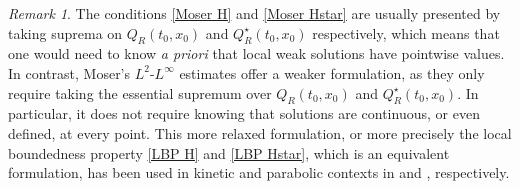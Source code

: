\documentclass[12pt, letterpaper]{amsart}
\theoremstyle{definition}
\theoremstyle{remark}
\newtheorem{rem}[thm]{Remark}
\numberwithin{equation}{section}
\begin{document}
\begin{rem}
    The conditions \eqref{Moser H} and \eqref{Moser Hstar} are usually presented by taking suprema on $Q_{R}(t_0,x_0)$ and $Q_{R}^\star(t_0,x_0)$ respectively, which means that one would need to know \textit{a priori} that local weak solutions have pointwise values. In contrast, Moser's $L^2$-$L^\infty$ estimates offer a weaker formulation, as they only require taking the essential supremum over $Q_{R}(t_0,x_0)$ and $Q_{R}^\star(t_0,x_0)$. In particular, it does not require knowing that solutions are continuous, or even defined, at every point. This more relaxed formulation, or more precisely the local boundedness property \eqref{LBP H} and \eqref{LBP Hstar}, which is an equivalent formulation, has been used in kinetic and parabolic contexts in \cite{auscher2024Kolmogorovfundamental} and \cite{auscher2023universal}, respectively.
\end{rem}
\end{document}
